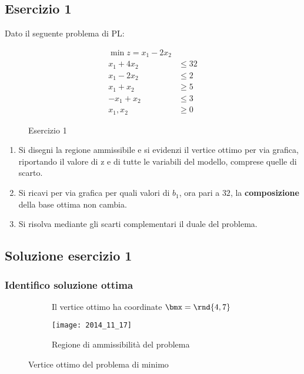 \documentclass[\main/main.tex]{subfiles}
\begin{document}
\subsection{Esercizio 1}
Dato il seguente problema di PL:

\begin{figure}
  \begin{align*}
    \min z = x_1 -2x_2   \\
    x_1 + 4x_2 & \leq 32 \\
    x_1 - 2x_2 & \leq 2  \\
    x_1 + x_2  & \geq 5  \\
    -x_1 + x_2 & \leq 3  \\
    x_1, x_2   & \geq 0
  \end{align*}
  \caption{Esercizio 1}
\end{figure}

\begin{enumerate}
  \item Si disegni la regione ammissibile e si evidenzi il vertice ottimo per via grafica, riportando il valore di z e di tutte le variabili del modello, comprese quelle di scarto.
  \item Si ricavi per via grafica per quali valori di $b_1$, ora pari a $32$, la \textbf{composizione} della base ottima non cambia.
  \item Si risolva mediante gli scarti complementari il duale del problema.
\end{enumerate}

\subsection{Soluzione esercizio 1}

\subsubsection*{Identifico soluzione ottima}

\begin{figure}
  \begin{subfigure}{0.49\textwidth}
    \caption{Il vertice ottimo ha coordinate $\bmx = \rnd{4,7}$}
  \end{subfigure}
  \begin{subfigure}{0.49\textwidth}
    \texttt{[image: 2014\_11\_17]}
    \caption{Regione di ammissibilità del problema}
  \end{subfigure}
  \caption{Vertice ottimo del problema di minimo}
\end{figure}
\end{document}
